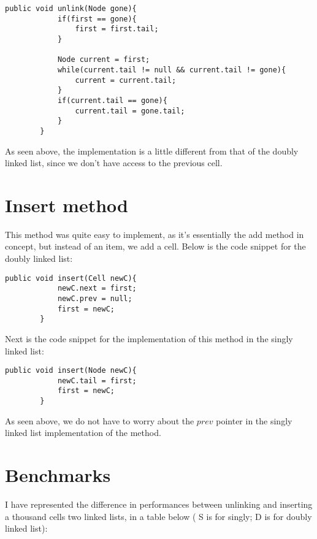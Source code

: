 \documentclass[a4paper,11pt]{article}
\begin{document}
\begin{verbatim}
public void unlink(Node gone){
            if(first == gone){
                first = first.tail;
            }

            Node current = first;
            while(current.tail != null && current.tail != gone){
                current = current.tail;
            } 
            if(current.tail == gone){
                current.tail = gone.tail;
            }
        }
\end{verbatim}
As seen above, the implementation is a little different from that of the doubly linked list, since we don't have access to the previous cell.


\section*{Insert method}

This method was quite easy to implement, as it's essentially the add method in concept, but instead of an item, we add a cell. Below is the code snippet for the doubly linked list: 

\begin{verbatim}
public void insert(Cell newC){
            newC.next = first;
            newC.prev = null;
            first = newC;
        }
\end{verbatim}

Next is the code snippet for the implementation of this method in the singly linked list:

\begin{verbatim}
public void insert(Node newC){
            newC.tail = first;
            first = newC;
        }
\end{verbatim}

As seen above, we do not have to worry about the $prev$ pointer in the singly linked list implementation of the method.


\section*{Benchmarks}

I have represented the difference in performances between unlinking and inserting a thousand cells two linked lists, in a table below ( S is for singly; D is for doubly linked list):
\end{document}
